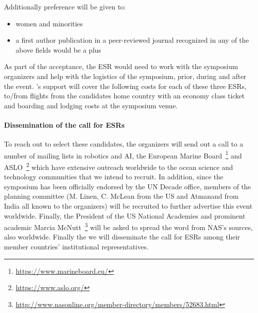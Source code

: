 \noindent
Additionally preference will be given to:

\begin{itemize}[noitemsep,topsep=0pt,parsep=0pt,partopsep=0pt]
\item women and minorities
\item a first author publication in a peer-reviewed journal recognized
  in any of the above fields would be a plus 
\end{itemize}

\noindent
As part of the acceptance, the ESR would need to work with the symposium
organizers and help with the logistics of the symposium, prior, during
and after the event. \nsfe's support will cover the following costs for
each of these three ESRs, to/from flights from the candidates home
country with an economy class ticket and boarding and lodging costs at
the symposium venue.

\paragraph{Dissemination of the call for ESRs} To reach out to select
these candidates, the organizers will send out a call to a number of
mailing lists in robotics and AI, the European Marine
Board~\footnote{\url{https://www.marineboard.eu/}} and
ASLO~\footnote{\url{https://www.aslo.org/}} which have extensive
outreach worldwide to the ocean science and technology communities
that we intend to recruit. In addition, since the symposium has been
officially endorsed by the UN Decade office, members of the planning
committee (M. Linen, C. McLean from the US and Atmanand from India all
known to the organizers) will be recruited to further advertise this
event worldwide. Finally, the President of the US National Academies
and prominent academic Marcia
McNutt~\footnote{\url{http://www.nasonline.org/member-directory/members/52683.html}}
will be asked to spread the word from NAS's sources, also
worldwide. Finally the \air we will disseminate the call for ESRs
among their member countries' institutional representatives.
